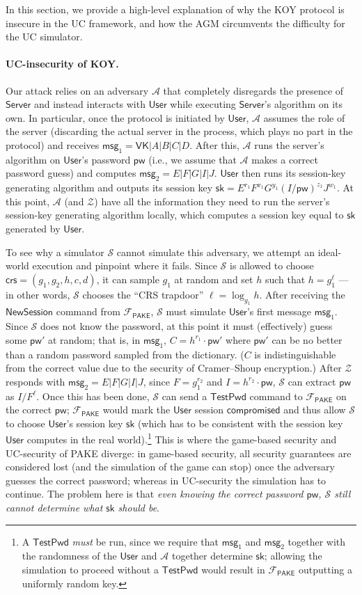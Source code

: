 \documentclass[10pt,a4paper]{article}
\newcommand{\simulator}{\mathcal{S}}
\newcommand{\env}{\mathcal{Z}}
\newcommand{\adv}{\mathcal{A}}
\newcommand{\pake}{\mathcal{F}_{\mathsf{PAKE}}}
\newcommand{\user}{\mathsf{User}}
\newcommand{\sk}{\mathsf{sk}}
\newcommand{\pw}{\mathsf{pw}}
\newcommand{\crs}{\mathsf{crs}}
\newcommand{\newsession}{\mathsf{NewSession}}
\newcommand{\testpwd}{\mathsf{TestPwd}}
\newcommand{\compromised}{\mathsf{compromised}}
\newcommand{\server}{\mathsf{Server}}
\newcommand{\msg}[1]{\mathsf{msg}_{#1}}
\begin{document}
In this section, we provide a high-level explanation of why the KOY protocol is insecure in the UC framework, and how the AGM circumvents the difficulty for the UC simulator.

	\paragraph{UC-insecurity of KOY.}
	Our attack relies on an adversary $\adv$ that completely disregards the presence of $\server$ and instead interacts with $\user$ while executing $\server$'s algorithm on its own. In particular, once the protocol is initiated by $\user$, $\adv$ assumes the role of the server (discarding the actual server in the process, which plays no part in the protocol) and receives $\msg{1} = \mathsf{VK}|A|B|C|D$. After this, $\adv$ runs the server's algorithm on $\user$'s password $\pw$ (i.e., we assume that $\adv$ makes a correct password guess) and computes $\msg{2} = E|F|G|I|J$. $\user$ then runs its session-key generating algorithm and outputs its session key $\sk = E^{r_1}F^{x_1}G^{y_1}(I/\pw)^{z_1}J^{w_1}$. At this point, $\adv$ (and $\env$) have all the information they need to run the server's session-key generating algorithm locally, which computes a session key equal to $\sk$ generated by $\user$.
	
	To see why a simulator $\simulator$ cannot simulate this adversary, we attempt an ideal-world execution and pinpoint where it fails. Since $\simulator$ is allowed to choose $\crs=(g_1, g_2, h, c, d)$, it can sample $g_1$ at random and set $h$ such that $h=g_1^{\ell}$ --- in other words, $\simulator$ chooses the ``CRS trapdoor'' $\ell = \log_{g_1} h$. After receiving the $\newsession$ command from $\pake$, $\simulator$ must simulate $\user$'s first message $\msg{1}$. Since $\simulator$ does not know the password, at this point it must (effectively) guess some $\pw'$ at random; that is, in $\msg{1}$, $C=h^{r_1}\cdot\pw'$ where $\pw'$ can be no better than a random password sampled from the dictionary. ($C$ is indistinguishable from the correct value due to the security of Cramer--Shoup encryption.) After $\env$ responds with $\msg{2} = E|F|G|I|J$, since $F = g_1^{r_2}$ and $I = h^{r_2} \cdot \pw$, $\simulator$ can extract $\pw$ as $I/F^\ell$. Once this has been done, $\simulator$ can send a $\testpwd$ command to $\pake$ on the correct $\pw$; $\pake$ would mark the $\user$ session $\compromised$ and thus allow $\simulator$ to choose $\user$'s session key $\sk$ (which has to be consistent with the session key $\user$ computes in the real world).\footnote{A $\testpwd$ \textit{must} be run, since we require that $\msg{1}$ and $\msg{2}$ together with the randomness of the $\user$ and $\adv$ together determine $\sk$; allowing the simulation to proceed without a $\testpwd$ would result in $\pake$ outputting a uniformly random key.} This is where the game-based security and UC-security of PAKE diverge: in game-based security, all security guarantees are considered lost (and the simulation of the game can stop) once the adversary guesses the correct password; whereas in UC-security the simulation has to continue. The problem here is that \emph{even knowing the correct password $\pw$, $\simulator$ still cannot determine what $\sk$ should be}.
\end{document}
